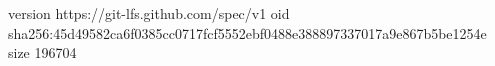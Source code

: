 version https://git-lfs.github.com/spec/v1
oid sha256:45d49582ca6f0385cc0717fcf5552ebf0488e388897337017a9e867b5be1254e
size 196704
